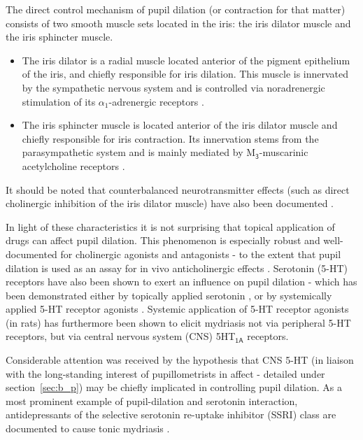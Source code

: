 	The direct control mechanism of pupil dilation (or contraction for that matter) consists of two smooth muscle sets located in the iris: the iris dilator muscle and the iris sphincter muscle.
	\begin{itemize}
	    \item The iris dilator is a radial muscle located anterior of the pigment epithelium of the iris, and chiefly responsible for iris dilation.
	    This muscle is innervated by the sympathetic nervous system and is controlled via noradrenergic stimulation of its $\alpha_1$-adrenergic receptors \citep{vanAlphen1976}.
	    \item The iris sphincter muscle is located anterior of the iris dilator muscle and chiefly responsible for iris contraction.
	    Its innervation stems from the parasympathetic system and is mainly mediated by M$\mathsf{_3}$-muscarinic acetylcholine receptors \citep{Woldemussie1993,Taylor1974}.
	\end{itemize}
	It should be noted that counterbalanced neurotransmitter effects (such as direct cholinergic inhibition of the iris dilator muscle) have also been documented \citep{Yoshitomi1985}.
	
	In light of these characteristics it is not surprising that topical application of drugs can affect pupil dilation.
	This phenomenon is especially robust and well-documented for cholinergic agonists \citep{Smith1978} and antagonists \citep{Gambill1967} -
	to the extent that pupil dilation is used as an assay for in vivo anticholinergic effects \citep{Bye1979}.
	Serotonin (5-HT) receptors have also been shown to exert an influence on pupil dilation - which has been demonstrated either by topically applied serotonin \citep{KOELLA1962}, or by systemically applied 5-HT receptor agonists \citep{Yu2004}.
	Systemic application of 5-HT receptor agonists (in rats) has furthermore been shown to elicit mydriasis not via peripheral 5-HT receptors, but via central nervous system (CNS) 5HT$\mathsf{_{1A}}$ receptors.
	
	Considerable attention was received by the hypothesis that CNS 5-HT (in liaison with the long-standing interest of pupillometrists in affect - detailed under section~\ref{sec:b_p}) may be chiefly implicated in controlling pupil dilation.
	As a most prominent example of pupil-dilation and serotonin interaction, antidepressants of the selective serotonin re-uptake inhibitor (SSRI) class are documented to cause tonic mydriasis \citep{Fitzgerald2013,Klein-Schwartz2012}.
	
